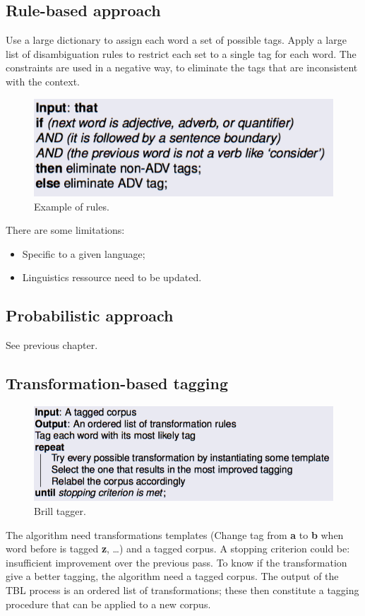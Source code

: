 
\subsection{Rule-based approach}

Use a large dictionary to assign each word a set of possible tags. Apply a large list of disambiguation rules to restrict each set to a single tag for each word. The constraints are used in a negative way, to eliminate the tags that are inconsistent with the context.

\begin{figure}[htp]
	\centering
	\includegraphics[scale=0.4]{images/35_rules.png}
 	\caption{Example of rules.}
\end{figure}

There are some limitations:
\begin{itemize}
	\item Specific to a given language;
	\item Linguistics ressource need to be updated. 
\end{itemize}

\subsection{Probabilistic approach}

See previous chapter.

\subsection{Transformation-based tagging}

\begin{figure}[htp]
	\centering
	\includegraphics[scale=0.4]{images/36_brill.png}
 	\caption{Brill tagger.}
\end{figure}
 The algorithm need transformations templates (Change tag from \textbf{a} to \textbf{b} when word before is tagged \textbf{z}, \dots) and a tagged corpus. A stopping criterion could be: insufficient improvement over the previous pass. To know if the transformation give a better tagging, the algorithm need a tagged corpus. The output of the TBL process is an ordered list of transformations; these then constitute a tagging procedure that can be applied to a new corpus. 

